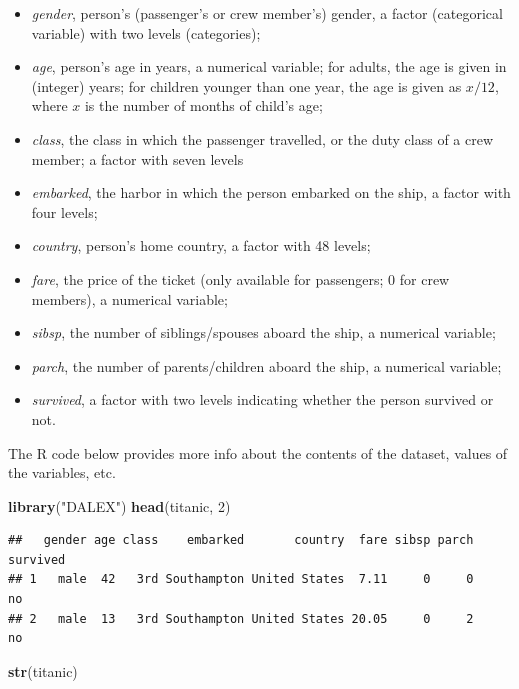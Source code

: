 \documentclass[12pt,]{krantz}
\newenvironment{Shaded}{\begin{snugshade}}{\end{snugshade}}
\newcommand{\DecValTok}[1]{\textcolor[rgb]{0.00,0.00,0.81}{#1}}
\newcommand{\KeywordTok}[1]{\textcolor[rgb]{0.13,0.29,0.53}{\textbf{#1}}}
\newcommand{\NormalTok}[1]{#1}
\newcommand{\StringTok}[1]{\textcolor[rgb]{0.31,0.60,0.02}{#1}}
\providecommand{\tightlist}{%
  \setlength{\itemsep}{0pt}\setlength{\parskip}{0pt}}
\theoremstyle{definition}
\theoremstyle{definition}
\theoremstyle{definition}
\theoremstyle{remark}
\begin{document}
\begin{itemize}
\tightlist
\item
  \emph{gender}, person's (passenger's or crew member's) gender, a
  factor (categorical variable) with two levels (categories);
\item
  \emph{age}, person's age in years, a numerical variable; for adults,
  the age is given in (integer) years; for children younger than one
  year, the age is given as \(x/12\), where \(x\) is the number of
  months of child's age;
\item
  \emph{class}, the class in which the passenger travelled, or the duty
  class of a crew member; a factor with seven levels
\item
  \emph{embarked}, the harbor in which the person embarked on the ship,
  a factor with four levels;
\item
  \emph{country}, person's home country, a factor with 48 levels;
\item
  \emph{fare}, the price of the ticket (only available for passengers; 0
  for crew members), a numerical variable;
\item
  \emph{sibsp}, the number of siblings/spouses aboard the ship, a
  numerical variable;
\item
  \emph{parch}, the number of parents/children aboard the ship, a
  numerical variable;
\item
  \emph{survived}, a factor with two levels indicating whether the
  person survived or not.
\end{itemize}

The R code below provides more info about the contents of the dataset,
values of the variables, etc.

\begin{Shaded}
\begin{Highlighting}[]
\KeywordTok{library}\NormalTok{(}\StringTok{"DALEX"}\NormalTok{)}
\KeywordTok{head}\NormalTok{(titanic, }\DecValTok{2}\NormalTok{)}
\end{Highlighting}
\end{Shaded}

\begin{verbatim}
##   gender age class    embarked       country  fare sibsp parch survived
## 1   male  42   3rd Southampton United States  7.11     0     0       no
## 2   male  13   3rd Southampton United States 20.05     0     2       no
\end{verbatim}

\begin{Shaded}
\begin{Highlighting}[]
\KeywordTok{str}\NormalTok{(titanic)}
\end{Highlighting}
\end{Shaded}
\end{document}
